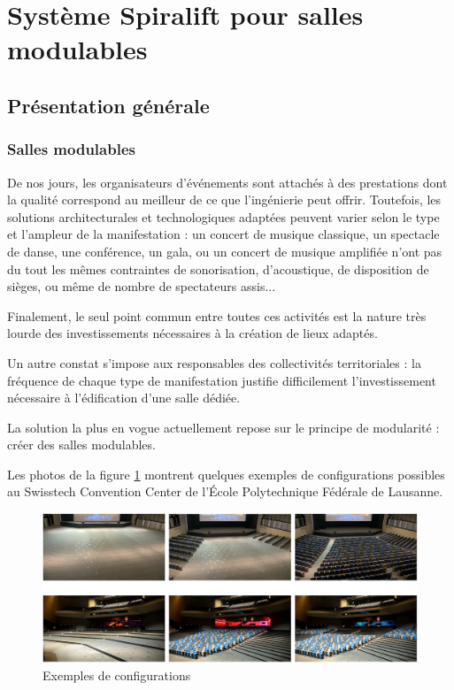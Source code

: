 

\section{Système Spiralift pour salles modulables}

\subsection{Présentation générale}

\subsubsection{Salles modulables}

De nos jours, les organisateurs d'événements sont attachés à des prestations dont la qualité correspond au meilleur de ce que l'ingénierie peut offrir. Toutefois, les solutions architecturales et technologiques adaptées peuvent varier selon le type et l'ampleur de la manifestation : un concert de musique classique, un spectacle de danse, une conférence, un gala, ou un concert de musique amplifiée n'ont pas du tout les mêmes contraintes de sonorisation, d'acoustique, de disposition de
sièges, ou même de nombre de spectateurs assis...

Finalement, le seul point commun entre toutes ces activités est la nature très lourde des investissements nécessaires à la création de lieux adaptés.

Un autre constat s'impose aux responsables des collectivités territoriales : la fréquence de chaque type de manifestation justifie difficilement l'investissement nécessaire à l'édification d'une salle dédiée.

La solution la plus en vogue actuellement repose sur le principe de modularité : créer des salles modulables.

Les photos de la figure \ref{fig01} montrent quelques exemples de configurations possibles au Swisstech Convention Center de l'École Polytechnique Fédérale de Lausanne.


\begin{figure}[!h]
 \centering\includegraphics[width=0.7\linewidth]{img/fig01}
 \caption{Exemples de configurations}
 \label{fig01}
\end{figure}

